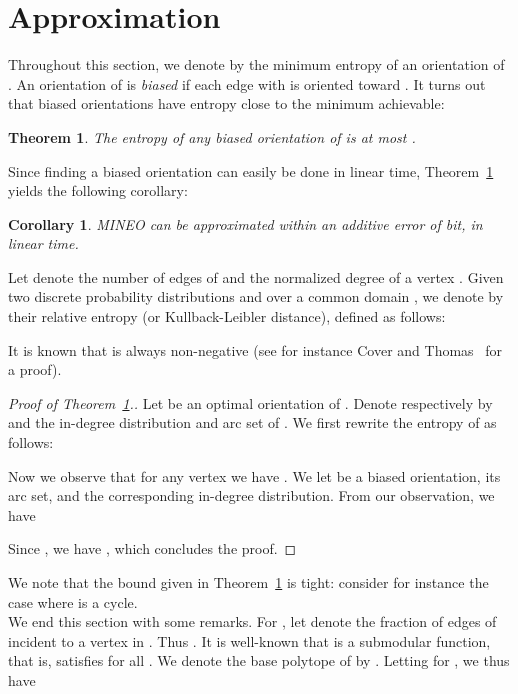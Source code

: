 \documentclass[11pt]{article}
\newtheorem{cor}{Corollary}
\newtheorem{theorem}{Theorem}
\begin{document}
\section{Approximation}
\label{sec-approx}

Throughout this section, we denote by  the minimum entropy
of an orientation of . An orientation of  is {\em biased} if each edge  with  is oriented toward . It turns out that biased orientations have entropy close to the minimum achievable:

\begin{theorem}
\label{th-approx}
The entropy of any biased orientation of  is at most .
\end{theorem}

Since finding a biased orientation can easily be done in linear time,
Theorem~\ref{th-approx} yields the following corollary:

\begin{cor}
\label{cor-approx}
MINEO can be approximated within an additive error of  bit, in linear time.
\end{cor}

Let  denote the number of edges of  and  the normalized degree of a vertex . Given two discrete probability distributions  and  over a common domain , 
we denote by  their relative entropy (or Kullback-Leibler distance), 
defined as follows: 

It is known that  is always non-negative (see for instance
Cover and Thomas~\cite[Section 2.6]{TC} for a proof). 

\begin{proof}[Proof of Theorem~\ref{th-approx}.]
Let  be an optimal orientation of . Denote respectively by  and  the in-degree distribution and arc set of . We first rewrite the entropy of  as follows:

Now we observe that for any vertex  we have . We let  be a biased orientation,  its arc set, and  the corresponding in-degree distribution. From our observation, we have
 
Since , we have , which concludes the proof.
\end{proof}

We note that the bound given in Theorem~\ref{th-approx} is tight: consider for instance the case where  is a cycle.\\

We end this section with some remarks. For , let  denote the fraction of edges of  incident to a vertex in . Thus . It is well-known that  is a submodular function, that is, satisfies  for all . We denote the base polytope of  by . 
Letting  for , 
we thus have
\end{document}
